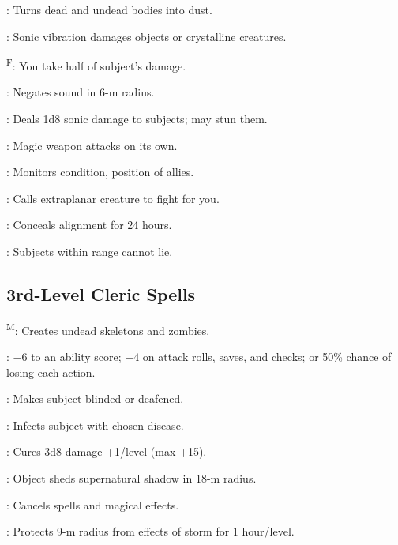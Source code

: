 : Turns dead and undead bodies into dust. %

: Sonic vibration damages objects or crystalline creatures.

\textsuperscript{F}: You take half of subject's damage.

: Negates sound in 6-m radius.

: Deals 1d8 sonic damage to subjects; may stun them.

: Magic weapon attacks on its own.

: Monitors condition, position of allies.

: Calls extraplanar creature to fight for you.

: Conceals alignment for 24 hours.

: Subjects within range cannot lie.



\subsection{3rd-Level Cleric Spells}

\textsuperscript{M}: Creates undead skeletons and zombies.

: $-6$ to an ability score; $-4$ on attack rolls, saves, and checks; or 50\% chance of losing each action.

: Makes subject blinded or deafened.

: Infects subject with chosen disease.



: Cures 3d8 damage +1/level (max +15).


: Object sheds supernatural shadow in 18-m radius.

: Cancels spells and magical effects.

: Protects 9-m radius from effects of storm for 1 hour/level. %

